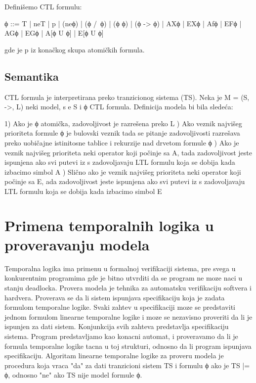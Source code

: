 \documentclass[a4paper]{article}
\begin{document}
	Definišemo CTL formulu:

	ϕ ::= T | neT | p | (neϕ) | (ϕ /\ ϕ) | (ϕ \/ ϕ) | (ϕ -> ϕ) | AXϕ | EXϕ | Afϕ | EFϕ | AGϕ | EGϕ | A[ϕ U ϕ] | E[ϕ U ϕ]

	gde je p iz konačkog skupa atomičkih formula.
	\newline
	\newline
	\subsection{Semantika}
	\label{subsec:podnaslovN}
	\newline
	\newline
	CTL formula je interpretirana preko tranzicionog sistema (TS). Neka je M = (S, ->, L) neki model, s e S i ϕ CTL formula.
	Definicija modela bi bila sledeća:

		1) Ako je ϕ atomička, zadovoljivost je razrešena preko L ) Ako veznik najvišeg prioriteta formule ϕ je bulovski veznik tada se pitanje zadovoljivosti razrešava
		   preko uobičajne istinitosne tablice i rekurzije nad drvetom formule ϕ ) Ako je veznik najvišeg prioriteta neki operator koji počinje sa A, tada zadovoljivost jeste ispunjena ako
		   svi putevi iz s zadovoljavaju LTL formulu koja se dobija kada izbacimo simbol A ) Slično ako je veznik najvišeg prioriteta neki operator koji počinje sa E, ada zadovoljivost jeste ispunjena ako
		   svi putevi iz s zadovoljavaju LTL formulu koja se dobija kada izbacimo simbol E \newline


	\section{Primena temporalnih logika u proveravanju modela}
	\label{sec:MC}

	Temporalna logika ima primenu u formalnoj verifikaciji sistema, pre svega u konkurentnim programima gde je bitno utvrditi da se program ne moze naci u stanju deadlocka. 
	Provera modela je tehnika za automatsku verifikaciju softvera i hardvera. Proverava se da li sistem ispunjava specifikaciju koja je zadata formulom temporalne logike. 
	Svaki zahtev u specifikaciji moze se predstaviti jednom formulom linearne temporalne logike i moze se nezavisno proveriti da li je ispunjen za dati sistem. Konjunkcija svih zahteva predstavlja specifikaciju sistema.
	Program predstavljamo kao konacni automat, i proveravamo da li je formula temporalne logike tacna u toj strukturi, odnosno da li program ispunjava specifikaciju.
	Algoritam linearne temporalne logike za proveru modela je procedura koja vraca "da" za dati tranzicioni sistem TS i formulu ϕ ako je TS |= ϕ, odnosno "ne" ako TS nije model formule ϕ.
\end{document}
